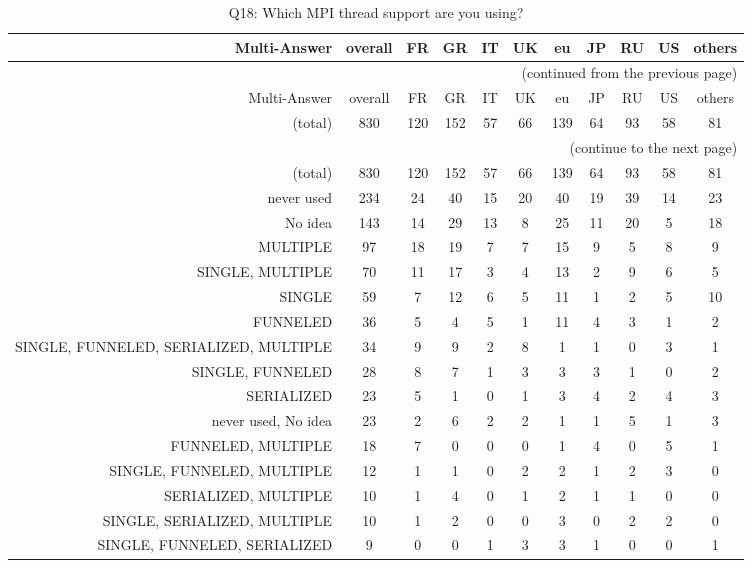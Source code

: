 \clearpage%
{\footnotesize\begin{landscape}%
\begin{longtable}[htb]{r|c|c|c|c|c|c|c|c|c|c}%
\caption{Q18: Which MPI thread support are you using?}%
\label{tab:Q18-mans} \\%
\hline%
Multi-Answer & overall & FR & GR & IT & UK & eu & JP & RU & US & others \\
 \hline%
\endfirsthead%
\multicolumn{11}{r}{(continued from the previous page)}\\%
\hline%
Multi-Answer & overall & FR & GR & IT & UK & eu & JP & RU & US & others \\
 \hline%
\endhead%
\hline%
(total) & 830 & 120 & 152 & 57 & 66 & 139 & 64 & 93 & 58 & 81 \\%
\hline%
\multicolumn{11}{r}{(continue to the next page)}\\%
\endfoot%
\hline%
(total) & 830 & 120 & 152 & 57 & 66 & 139 & 64 & 93 & 58 & 81 \\%
\hline%
\endlastfoot%
\hline%
{never used} & 234 & 24 & 40 & 15 & 20 & 40 & 19 & 39 & 14 & 23 \\%
{No idea} & 143 & 14 & 29 & 13 & 8 & 25 & 11 & 20 & 5 & 18 \\%
{MULTIPLE} & 97 & 18 & 19 & 7 & 7 & 15 & 9 & 5 & 8 & 9 \\%
{SINGLE, MULTIPLE} & 70 & 11 & 17 & 3 & 4 & 13 & 2 & 9 & 6 & 5 \\%
{SINGLE} & 59 & 7 & 12 & 6 & 5 & 11 & 1 & 2 & 5 & 10 \\%
{FUNNELED} & 36 & 5 & 4 & 5 & 1 & 11 & 4 & 3 & 1 & 2 \\%
{SINGLE, FUNNELED, SERIALIZED, MULTIPLE} & 34 & 9 & 9 & 2 & 8 & 1 & 1 & 0 & 3 & 1 \\%
{SINGLE, FUNNELED} & 28 & 8 & 7 & 1 & 3 & 3 & 3 & 1 & 0 & 2 \\%
{SERIALIZED} & 23 & 5 & 1 & 0 & 1 & 3 & 4 & 2 & 4 & 3 \\%
{never used, No idea} & 23 & 2 & 6 & 2 & 2 & 1 & 1 & 5 & 1 & 3 \\%
{FUNNELED, MULTIPLE} & 18 & 7 & 0 & 0 & 0 & 1 & 4 & 0 & 5 & 1 \\%
{SINGLE, FUNNELED, MULTIPLE} & 12 & 1 & 1 & 0 & 2 & 2 & 1 & 2 & 3 & 0 \\%
{SERIALIZED, MULTIPLE} & 10 & 1 & 4 & 0 & 1 & 2 & 1 & 1 & 0 & 0 \\%
{SINGLE, SERIALIZED, MULTIPLE} & 10 & 1 & 2 & 0 & 0 & 3 & 0 & 2 & 2 & 0 \\%
{SINGLE, FUNNELED, SERIALIZED} & 9 & 0 & 0 & 1 & 3 & 3 & 1 & 0 & 0 & 1 \\%

\end{longtable}
\end{landscape}}
